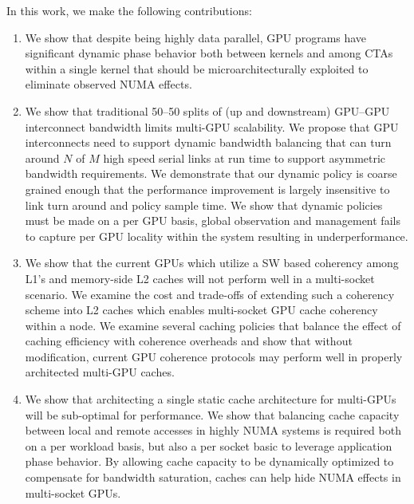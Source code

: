 In this work, we make the following contributions:

\begin{enumerate}
\item
We show that despite being highly data parallel, GPU programs have significant
dynamic phase behavior both between kernels and among CTAs within a single
kernel that should be microarchitecturally exploited to eliminate observed
NUMA effects.

\item
We show that traditional 50--50 splits of (up and 
downstream) GPU--GPU interconnect bandwidth limits multi-GPU scalability.  We propose
that GPU interconnects need to support dynamic bandwidth balancing that can
turn around $N$ of $M$ high speed serial links at run time to support asymmetric
bandwidth requirements.  We demonstrate that our dynamic policy is coarse
grained enough that the performance improvement is largely insensitive to link turn 
around and policy sample time.  We show that dynamic policies must be made on a
per GPU basis, global observation and management fails to capture per GPU locality
within the system resulting in underperformance.

\item
We show that the current GPUs which utilize a SW based coherency among L1's and 
memory-side L2 caches will not perform well in a multi-socket scenario.  
We examine the cost and trade-offs of extending such a coherency scheme into L2 caches 
which enables multi-socket GPU cache coherency within a node.  We examine several
caching policies that balance the effect of caching efficiency with coherence overheads
and show that without modification, current GPU coherence protocols may perform
well in properly architected multi-GPU caches.

\item
We show that architecting a single static cache architecture for multi-GPUs will
be sub-optimal for performance. We show that balancing cache capacity between
local and remote accesses in highly NUMA systems is required both on a per
workload basis, but also a per socket basic to leverage application phase
behavior.  By allowing cache capacity to be dynamically optimized to compensate for
bandwidth saturation, caches can help hide NUMA effects in multi-socket GPUs.






\end{enumerate}
